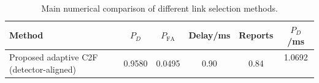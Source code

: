 \begin{table}[t]
    \centering
    \caption{Main numerical comparison of different link selection methods.}
    \label{tab:main_summary}
    \begin{tabular}{l c c c c c}
        \hline
        Method & $P_D$ & $P_{\mathrm{FA}}$ & Delay/ms & Reports & $P_D$/ms \\
        \hline
        Proposed adaptive C2F (detector-aligned) & 0.9580 & 0.0495 & 0.90 & 0.84 & 1.0692 \
        \hline
    \end{tabular}
\end{table}
